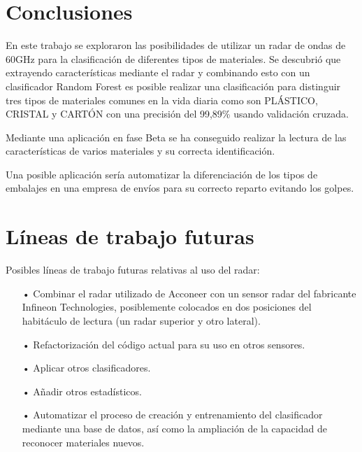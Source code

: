 
\section{Conclusiones}

En este trabajo se exploraron las posibilidades de utilizar un radar de ondas de 60GHz para la clasificación de diferentes tipos de materiales. Se descubrió que extrayendo características mediante el radar y combinando esto con un clasificador Random Forest es posible realizar una clasificación  para distinguir tres tipos de materiales comunes en la vida diaria como son PLÁSTICO, CRISTAL y CARTÓN con una precisión del 99,89\% usando validación cruzada. 

Mediante una aplicación en fase Beta se ha conseguido realizar la lectura de las características de varios materiales y su correcta identificación.

Una posible aplicación sería automatizar la diferenciación de los tipos de embalajes en una empresa de envíos para su correcto reparto evitando los golpes.

\section{Líneas de trabajo futuras}

Posibles líneas de trabajo futuras relativas al uso del radar:

\begin{itemize}
\item[•] Combinar el radar utilizado de Acconeer con un sensor radar del fabricante Infineon Technologies, posiblemente colocados en dos posiciones del habitáculo de lectura (un radar superior y otro lateral).
\item[•] Refactorización del código actual para su uso en otros sensores.
\item[•] Aplicar otros clasificadores.
\item[•]Añadir otros estadísticos.
\item[•] Automatizar el proceso de creación y entrenamiento del clasificador mediante una base de datos, así como la ampliación de la capacidad de reconocer materiales nuevos.
\end{itemize}

